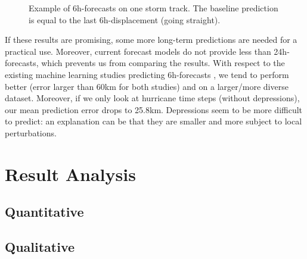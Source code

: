 \begin{figure}
	\begin{center}
		\hsize {}
	\end{center}
	\caption{Example of 6h-forecasts on one storm track. The baseline prediction is equal to the last 6h-displacement (going straight).}
	\label{fig:track}
\end{figure}


If these results are promising, some more long-term predictions are needed for a practical use. Moreover, current forecast models do not provide less than 24h-forecasts, which prevents us from comparing the results. With respect to the existing machine learning studies predicting 6h-forecasts \cite{liberge2011prevision,moradi2016sparse}, we tend to perform better (error larger than 60km for both studies) and on a larger/more diverse dataset. Moreover, if we only look at hurricane time steps (without depressions), our mean prediction error drops to 25.8km. Depressions seem to be more difficult to predict: an explanation can be that they are smaller and more subject to local perturbations.

\section{Result Analysis}
\subsection{Quantitative}

\subsection{Qualitative}


